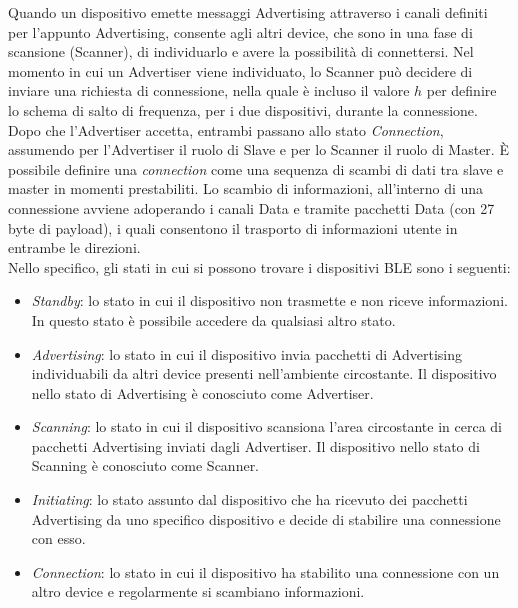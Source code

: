 \noindent Quando un dispositivo emette messaggi Advertising attraverso i canali definiti per l'appunto Advertising, consente agli altri device, che sono in una fase di scansione (Scanner), di individuarlo e avere la possibilità di connettersi. Nel momento in cui un Advertiser viene individuato, lo Scanner può decidere di inviare una richiesta di connessione, nella quale è incluso il valore $h$ per definire lo schema di salto di frequenza, per i due dispositivi, durante la connessione. Dopo che l'Advertiser accetta, entrambi passano allo stato \textit{Connection}, assumendo per l'Advertiser il ruolo di Slave e per lo Scanner il ruolo di Master. 
\MakeUppercase{è} possibile definire una \textit{connection} come una sequenza di scambi di dati tra slave e master in momenti prestabiliti. Lo scambio di informazioni, all'interno di una connessione avviene adoperando i canali Data e tramite pacchetti Data (con 27 byte di payload), i quali consentono il trasporto di informazioni utente in entrambe le direzioni.\\
Nello specifico, gli stati in cui si possono trovare i dispositivi BLE sono i seguenti:

\begin{itemize}
    \item \textit{Standby}: lo stato in cui il dispositivo non trasmette e non riceve informazioni. In questo stato è possibile accedere da qualsiasi altro stato.
    
    \item \textit{Advertising}: lo stato in cui il dispositivo invia pacchetti di Advertising individuabili da altri device presenti nell'ambiente circostante. Il dispositivo nello stato di Advertising è conosciuto come Advertiser.
    
    \item \textit{Scanning}: lo stato in cui il dispositivo scansiona l'area circostante in cerca di pacchetti Advertising inviati dagli Advertiser. Il dispositivo nello stato di Scanning è conosciuto come Scanner.
    
    \item \textit{Initiating}: lo stato assunto dal dispositivo che ha ricevuto dei pacchetti Advertising da uno specifico dispositivo e decide di stabilire una connessione con esso.
    
    \item \textit{Connection}: lo stato in cui il dispositivo ha stabilito una connessione con un altro device e regolarmente si scambiano informazioni.
\end{itemize}

